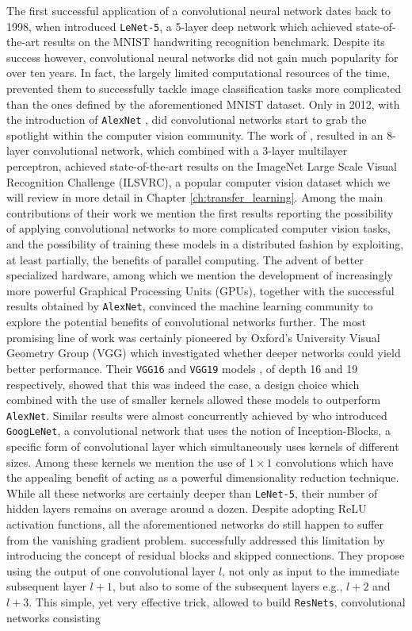 The first successful application of a convolutional neural network dates back to 1998, when \citet{lecun1998gradient} introduced \texttt{LeNet-5}, a 5-layer deep network which achieved state-of-the-art results on the MNIST handwriting recognition benchmark. Despite its success however, convolutional neural networks did not gain much popularity for over ten years. In fact, the largely limited computational resources of the time, prevented them to successfully tackle image classification tasks more complicated than the ones defined by the aforementioned MNIST dataset. Only in 2012, with the introduction of \texttt{AlexNet} \cite{krizhevsky2012imagenet}, did convolutional networks start to grab the spotlight within the computer vision community.  The work of \citet{krizhevsky2012imagenet}, resulted in an 8-layer convolutional network, which combined with a 3-layer multilayer perceptron, achieved state-of-the-art results on the ImageNet Large Scale Visual Recognition Challenge (ILSVRC), a popular computer vision dataset which we will review in more detail in Chapter \ref{ch:transfer_learning}. Among the main contributions of their work we mention the first results reporting the possibility of applying convolutional networks to more complicated computer vision tasks, and the possibility of training these models in a distributed fashion by exploiting, at least partially, the benefits of parallel computing. The advent of better specialized hardware, among which we mention the development of increasingly more powerful Graphical Processing Units (GPUs), together with the successful results obtained by \texttt{AlexNet}, convinced the machine learning community to explore the potential benefits of convolutional networks further. The most promising line of work was certainly pioneered by Oxford's University Visual Geometry Group (VGG) which investigated whether deeper networks could yield better performance. Their \texttt{VGG16} and \texttt{VGG19} models \cite{simonyan2014very}, of depth 16 and 19 respectively, showed that this was indeed the case, a design choice which combined with the use of smaller kernels allowed these models to outperform \texttt{AlexNet}. Similar results were almost concurrently achieved by \citet{szegedy2015going} who introduced \texttt{GoogLeNet}, a convolutional network that uses the notion of Inception-Blocks, a specific form of convolutional layer which simultaneously uses kernels of different sizes. Among these kernels we mention the use of $1\times1$ convolutions which have the appealing benefit of acting as a powerful dimensionality reduction technique. While all these networks are certainly deeper than \texttt{LeNet-5}, their number of hidden layers remains on average around a dozen. Despite adopting ReLU activation functions, all the aforementioned networks do still happen to suffer from the vanishing gradient problem. \citet{he2016deep} successfully addressed this limitation by introducing the concept of residual blocks and skipped connections. They propose using the output of one convolutional layer $l$, not only as input to the immediate subsequent layer $l+1$, but also to some of the subsequent layers e.g., $l+2$ and $l+3$. This simple, yet very effective trick, allowed \citet{he2016deep} to build \texttt{ResNets}, convolutional networks consisting 